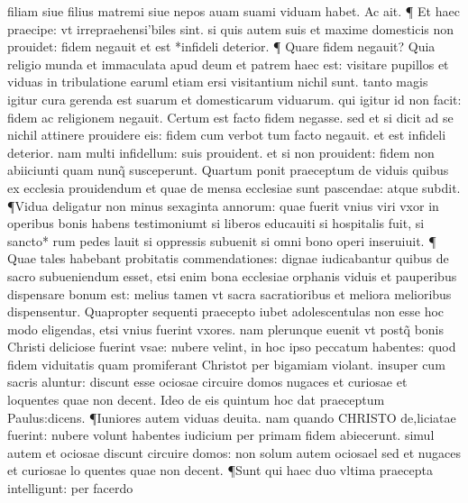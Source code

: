\documentclass{article}
\begin{document}
\begin{pages}
filiam siue filius matremi siue nepos auam suami viduam habet. Ac ait. ¶ Et haec praecipe: vt irrepraehensi'biles sint. si quis autem suis et maxime domesticis non prouidet: fidem negauit et est *infideli deterior. ¶ Quare fidem negauit? Quia religio munda et immaculata apud deum et patrem haec est: visitare pupillos et viduas in tribulatione earuml etiam ersi visitantium nichil sunt. tanto magis igitur cura gerenda est suarum et domesticarum viduarum. qui igitur id non facit: fidem ac religionem negauit. Certum est facto fidem negasse. sed et si dicit ad se nichil attinere prouidere eis: fidem cum verbot tum facto negauit. et est infideli deterior. nam multi infidellum: suis prouident. et si non prouident: fidem non abiiciunti quam nunq̃ susceperunt. Quartum ponit praeceptum de viduis quibus ex ecclesia prouidendum et quae de mensa ecclesiae sunt pascendae: atque  subdit. ¶Vidua deligatur non minus sexaginta annorum: quae fuerit vnius viri vxor   in operibus bonis habens testimoniumt si liberos educauiti si hospitalis fuit, si sancto* rum pedes lauit si oppressis subuenit si omni bono operi inseruiuit. ¶ Quae tales habebant probitatis commendationes: dignae iudicabantur quibus de sacro subueniendum esset, etsi enim bona ecclesiae orphanis viduis et pauperibus dispensare bonum est: melius tamen vt sacra sacratioribus et meliora melioribus dispensentur. Quapropter sequenti praecepto iubet adolescentulas non esse hoc modo eligendas, etsi vnius fuerint vxores. nam plerunque euenit vt postq̃ bonis Christi deliciose fuerint vsae: nubere velint, in hoc ipso peccatum habentes: quod fidem viduitatis quam promiferant Christot per bigamiam violant. insuper cum sacris aluntur: discunt esse ociosae circuire domos  nugaces et curiosae et loquentes quae non decent. Ideo de eis quintum hoc dat praeceptum Paulus:dicens. ¶Iuniores autem viduas deuita. nam quando CHRISTO de,liciatae fuerint: nubere volunt habentes iudicium per primam fidem abiecerunt. simul  autem et ociosae discunt circuire domos: non solum autem ociosael sed et nugaces et curiosae lo quentes quae non decent. ¶Sunt qui haec duo vltima praecepta intelligunt: per facerdo\pend

\end{pages}
\end{document}
